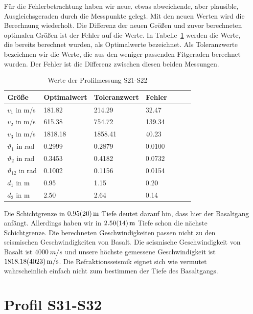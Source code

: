 Für die Fehlerbetrachtung haben wir neue, etwas abweichende, aber plausible, 
Ausgleichsgeraden durch die Messpunkte gelegt. Mit den neuen Werten wird die Berechnung wiederholt. Die Differenz der neuen Größen und zuvor berechneten optimalen Größen ist der Fehler auf die Werte. In Tabelle~\ref{tab:S21-S22} werden die Werte, die bereits berechnet wurden, als Optimalwerte bezeichnet. Als Toleranzwerte bezeichnen wir die Werte, die aus den weniger passenden Fitgeraden berechnet wurden. Der Fehler ist die Differenz zwischen diesen beiden Messungen.

\begin{table}[!ht]
\centering
\caption{Werte der Profilmessung S21-S22}
\label{tab:S21-S22}
\begin{tabular}{lllllll}
\toprule
Größe   & Optimalwert   & Toleranzwert   & Fehler \\
\midrule
$v_1$ in m/s & 181.82 & 214.29 & 32.47 \\
$v_2$ in m/s & 615.38 & 754.72 & 139.34 \\
$v_3$ in m/s & 1818.18 & 1858.41 & 40.23 \\
$\vartheta_1$ in rad & 0.2999 & 0.2879 & 0.0100 \\
$\vartheta_2$ in rad & 0.3453 & 0.4182 & 0.0732 \\
$\vartheta_{12}$ in rad & 0.1002 & 0.1156 & 0.0154 \\
$d_1$ in m & 0.95 & 1.15 & 0.20 \\
$d_2$ in m & 2.50 & 2.64 & 0.14 \\
\bottomrule
\end{tabular}
\end{table}

Die Schichtgrenze in $\SI{0.95 \pm 0.20}{m}$  Tiefe deutet darauf hin, dass hier der Basaltgang anfängt. Allerdings haben wir in $\SI{2.50 \pm 0.14}{m}$ Tiefe schon die nächste Schichtgrenze. Die berechneten Geschwindigkeiten passen nicht zu den seismischen Geschwindigkeiten von Basalt. Die seismische Geschwindigkeit von Basalt ist $\SI{4000}{m/s}$ und unsere höchste gemessene Geschwindigkeit ist $\SI{1818.18 \pm 40.23}{m/s}$.
Die Refraktionsseismik eignet sich wie vermutet wahrscheinlich einfach nicht zum bestimmen der Tiefe des Basaltgangs. 


\section{Profil S31-S32}

